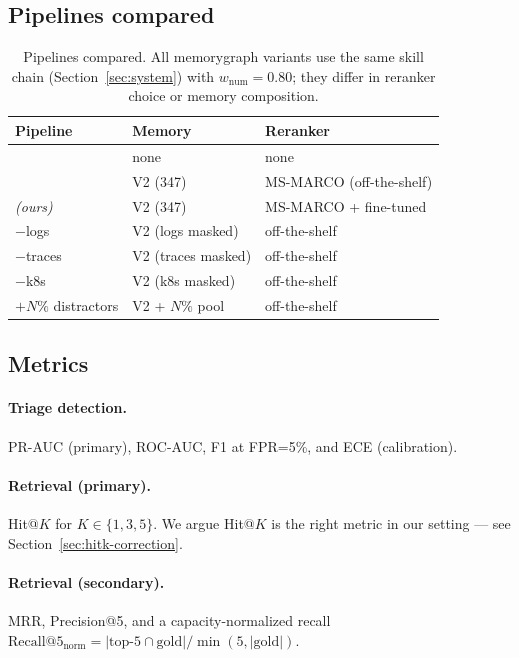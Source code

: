 \subsection{Pipelines compared}

\begin{table}[h]
\centering
\small
\caption{Pipelines compared. All memorygraph variants use the same skill chain (Section~\ref{sec:system}) with $w_{\text{num}}=0.80$; they differ in reranker choice or memory composition.}
\label{tab:pipelines}
\begin{tabular}{lll}
\toprule
Pipeline & Memory & Reranker \\
\midrule
\hgb{}                     & none                & none                        \\
\sota{}                    & V2 (347)            & MS-MARCO (off-the-shelf)    \\
\sotaft{} \textit{(ours)}  & V2 (347)            & MS-MARCO + fine-tuned       \\
\sota{}$-$logs             & V2 (logs masked)    & off-the-shelf               \\
\sota{}$-$traces           & V2 (traces masked)  & off-the-shelf               \\
\sota{}$-$k8s              & V2 (k8s masked)     & off-the-shelf               \\
\sota{}$+N\%$ distractors  & V2 + $N\%$ pool     & off-the-shelf               \\
\bottomrule
\end{tabular}
\end{table}

\subsection{Metrics}

\paragraph{Triage detection.} PR-AUC (primary), ROC-AUC, F1 at FPR=5\%, and ECE (calibration).

\paragraph{Retrieval (primary).} Hit@$K$ for $K \in \{1, 3, 5\}$. We argue Hit@$K$ is the right metric in our setting --- see Section~\ref{sec:hitk-correction}.

\paragraph{Retrieval (secondary).} MRR, Precision@5, and a capacity-normalized recall $\text{Recall@5}_{\text{norm}} = |\text{top-}5 \cap \text{gold}| / \min(5, |\text{gold}|)$.


